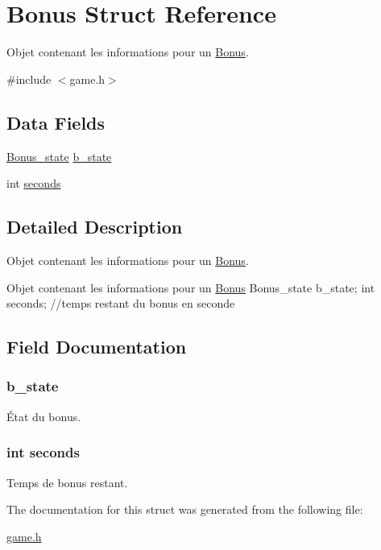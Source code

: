 \hypertarget{struct_bonus}{}\section{Bonus Struct Reference}
\label{struct_bonus}


Objet contenant les informations pour un \hyperlink{struct_bonus}{Bonus}.  




{\ttfamily \#include $<$game.\+h$>$}

\subsection*{Data Fields}
\begin{DoxyCompactItemize}
\item 
\hyperlink{game_8h_a7b2ac2fd4d85740443adc95ada0f4784}{Bonus\+\_\+state} \hyperlink{struct_bonus_a324a9cb1255c167d1e6341ec644245d4}{b\+\_\+state}
\item 
int \hyperlink{struct_bonus_a77bd4f876bdc3afed5acdd936f775d34}{seconds}
\end{DoxyCompactItemize}


\subsection{Detailed Description}
Objet contenant les informations pour un \hyperlink{struct_bonus}{Bonus}. 

Objet contenant les informations pour un \hyperlink{struct_bonus}{Bonus} Bonus\+\_\+state b\+\_\+state; int seconds; //temps restant du bonus en seconde 

\subsection{Field Documentation}
\subsubsection[{\texorpdfstring{b\+\_\+state}{b_state}}]{ b\+\_\+state}\hypertarget{struct_bonus_a324a9cb1255c167d1e6341ec644245d4}{}\label{struct_bonus_a324a9cb1255c167d1e6341ec644245d4}
État du bonus. 
\subsubsection[{\texorpdfstring{seconds}{seconds}}]{\setlength{\rightskip}{0pt plus 5cm}int seconds}\hypertarget{struct_bonus_a77bd4f876bdc3afed5acdd936f775d34}{}\label{struct_bonus_a77bd4f876bdc3afed5acdd936f775d34}
Temps de bonus restant. 

The documentation for this struct was generated from the following file\+:\begin{DoxyCompactItemize}
\item 
\hyperlink{game_8h}{game.\+h}\end{DoxyCompactItemize}
